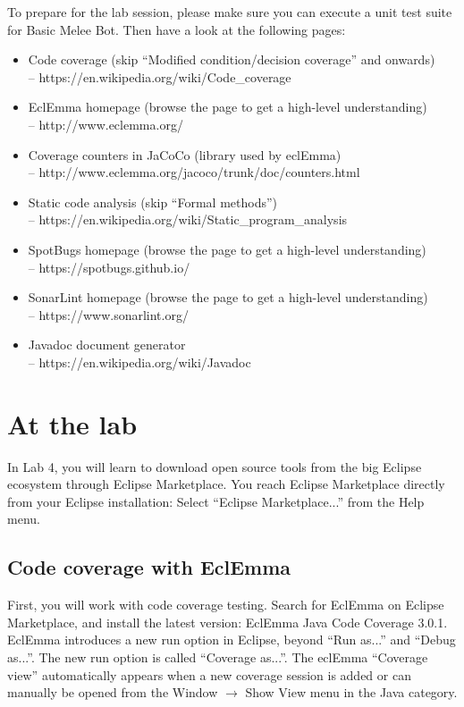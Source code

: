 \documentclass{scrreprt}
\begin{document}
To prepare for the lab session, please make sure you can execute a unit test suite for Basic Melee Bot. Then have a look at the following pages:
\begin{itemize}
\item Code coverage (skip ``Modified condition/decision coverage'' and onwards)\\-- https://en.wikipedia.org/wiki/Code_coverage
\item EclEmma homepage (browse the page to get a high-level understanding) \\-- http://www.eclemma.org/
\item Coverage counters in JaCoCo (library used by eclEmma) \\-- http://www.eclemma.org/jacoco/trunk/doc/counters.html
\item Static code analysis (skip ``Formal methods'') \\-- https://en.wikipedia.org/wiki/Static_program_analysis
\item SpotBugs homepage (browse the page to get a high-level understanding) \\-- https://spotbugs.github.io/
\item SonarLint homepage (browse the page to get a high-level understanding) \\-- https://www.sonarlint.org/
\item Javadoc document generator \\-- https://en.wikipedia.org/wiki/Javadoc
\end{itemize}

\chapter{At the lab} \label{sec:atlab}
In Lab 4, you will learn to download open source tools from the big Eclipse ecosystem through Eclipse Marketplace. You reach Eclipse Marketplace directly from your Eclipse installation: Select ``Eclipse Marketplace...'' from the Help menu.

\section{Code coverage with EclEmma}
First, you will work with code coverage testing. Search for EclEmma on Eclipse Marketplace, and install the latest version: EclEmma Java Code Coverage 3.0.1. EclEmma introduces a new run option in Eclipse, beyond ``Run as...'' and ``Debug as...''. The new run option is called ``Coverage as...''. The eclEmma ``Coverage view'' automatically appears when a new coverage session is added or can manually be opened from the Window $\rightarrow$ Show View menu in the Java category. 
\end{document}
